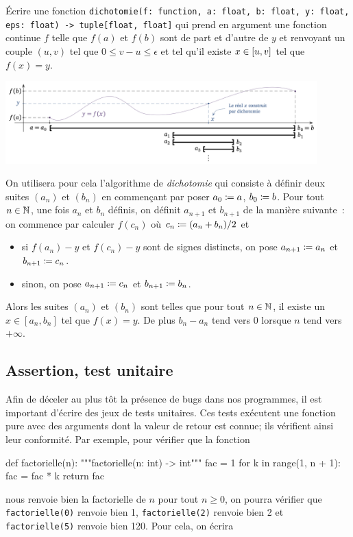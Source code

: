 \documentclass{magnolia}
\begin{document}
\begin{exoUnique}
\exo Écrire une fonction
\verb_dichotomie(f: function, a: float, b: float, y: float, eps: float) -> tuple[float, float]_ qui prend en argument
une fonction continue $f$ telle que $f(a)$ et $f(b)$ sont de part et d'autre de $y$ et renvoyant un couple $(u,v)$ tel que $0\leq v-u\leq\epsilon$ et tel qu'il existe $x\in\left[u,v\right]$ tel que $f(x)=y$.\\
\begin{center}
  \includegraphics[width=0.9\textwidth]{../../Commun/Images/python-cours-dichotomie}
  \end{center}
On utilisera pour cela
l'algorithme de \emph{dichotomie} qui consiste à définir deux suites $(a_n)$ et $(b_n)$ en
commençant par poser $a_0\coloneqq a$, $b_0\coloneqq b$. Pour tout $n\in\mathbb{N}$, une fois $a_n$
et $b_n$ définis, on
définit $a_{n+1}$ et $b_{n+1}$ de la manière suivante~: on commence par calculer $f(c_n)$
où $c_n\coloneqq(a_n + b_n)/2$ et
\begin{itemize}
\item si $f(a_n)-y$ et $f(c_n)-y$ sont de signes distincts, on pose $a_{n+1}\coloneqq a_n$ et $b_{n+1}\coloneqq c_n$.
\item sinon, on pose $a_{n+1}\coloneqq c_n$ et $b_{n+1}\coloneqq b_n$.
\end{itemize}
Alors les suites $(a_n)$ et $(b_n)$ sont telles que pour tout $n\in\mathbb{N}$, il existe un
$x\in[a_n,b_n]$ tel que $f(x)=y$. De plus $b_n-a_n$ tend vers 0 lorsque $n$ tend vers $+\infty$.
\end{exoUnique}

\subsection{Assertion, test unitaire}

Afin de déceler au plus tôt la présence de bugs dans nos programmes, il est important
d'écrire des jeux de tests unitaires. Ces tests exécutent une fonction pure avec
des arguments dont la valeur de retour est connue; ils vérifient ainsi leur conformité. Par exemple,
pour vérifier que la fonction

\begin{pythoncodeline}
def factorielle(n):
    """factorielle(n: int) -> int"""
    fac = 1
    for k in range(1, n + 1):
        fac = fac * k
    return fac
\end{pythoncodeline}
\noindent nous renvoie bien la factorielle de $n$ pour tout $n\geq 0$,
on pourra vérifier que \verb!factorielle(0)! renvoie bien 1, \verb!factorielle(2)! renvoie bien 2 et
\verb!factorielle(5)! renvoie bien 120. Pour cela, on écrira
\end{document}
